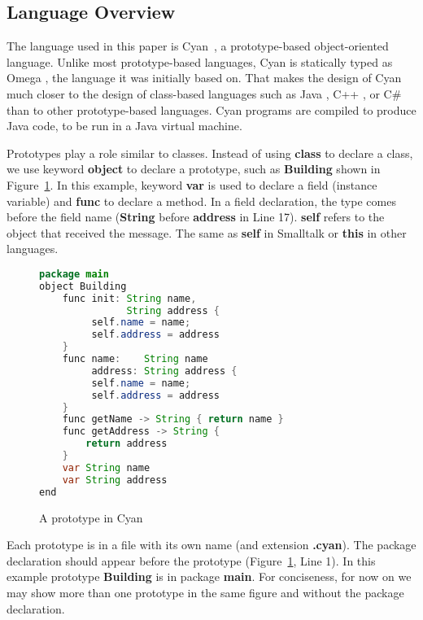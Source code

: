 \documentclass[preprint,review]{elsarticle}
\newcommand{\srcstyle}[1]{\ttfamily\textbf{#1}\rmfamily}
\begin{document}
\subsection{Language Overview}

The language  used in  this paper is  Cyan~\cite{guimaraes2013cyan}, a
prototype-based  object-oriented  language.   Unlike
most  prototype-based languages,  Cyan  is statically  typed as  Omega
\cite{DBLP:books/daglib/0072762}, the language  it was initially based
on.  That makes  the  design of  Cyan  much closer  to  the design  of
class-based  languages  such  as  Java \cite{Gosling:2014:JLS:2636997},
C++ \cite{Stroustrup:2013:CPL:2543987}, or  C\# \cite{csharp:2017:Online} than  to  other
prototype-based languages. Cyan programs  are compiled to produce Java
code, to be run in a Java virtual machine.

Prototypes  play  a  role  similar   to  classes.   Instead  of  using
\srcstyle{class} to declare a  class, we use keyword \srcstyle{object}
to  declare   a  prototype,  such  as   \srcstyle{Building}  shown  in
Figure~\ref{fig:Building}.  In this example, keyword \srcstyle{var} is
used to  declare a  field (instance  variable) and  \srcstyle{func} to
declare a  method.  In a field  declaration, the type comes  before the
field name  (\srcstyle{String} before \srcstyle{address} in  Line 17).
\srcstyle{self} refers  to the object  that received the  message. The
same  as  \srcstyle{self} in  Smalltalk \cite{Goldberg:1983:SLI:273} or  \srcstyle{this} in  other
languages.

\begin{figure}[htb]
\centering
\begin{lstlisting}[language=Java]
package main
object Building
    func init: String name,
               String address {
         self.name = name;
         self.address = address
    }
    func name:    String name
         address: String address {
         self.name = name;
         self.address = address
    }
    func getName -> String { return name }
    func getAddress -> String {
        return address
    }
    var String name
    var String address
end
\end{lstlisting}
\caption{A prototype in Cyan}
\label{fig:Building}
\end{figure}

Each  prototype  is  in  a  file with  its  own  name  (and  extension
\srcstyle{.cyan}). The  package declaration  should appear  before the
prototype  (Figure~\ref{fig:Building},  Line   1).   In  this  example
prototype  \srcstyle{Building}  is  in package  \srcstyle{main}.   For
conciseness, for  now on we  may show more  than one prototype  in the
same figure and without the package declaration.
\end{document}
